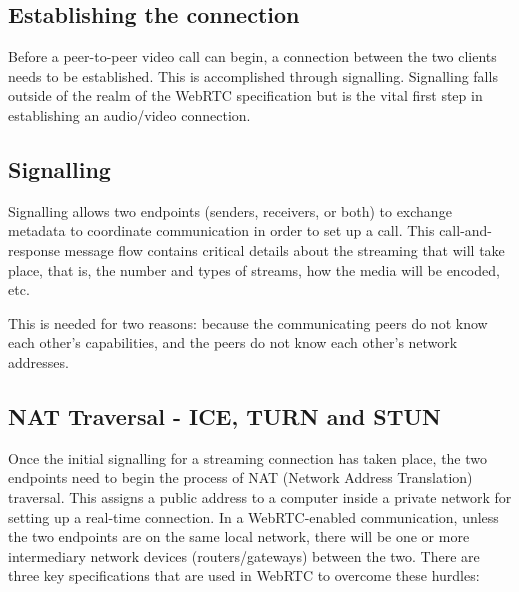 \subsection{Establishing the connection}

Before a peer-to-peer video call can begin, a connection between the two clients 
needs to be established. This is accomplished through signalling. Signalling falls 
outside of the realm of the WebRTC specification but is the vital first step in establishing 
an audio/video connection.

\subsection{Signalling}

Signalling allows two endpoints (senders, receivers, or both) to exchange metadata to 
coordinate communication in order to set up a call. This call-and-response message flow 
contains critical details about the streaming that will take place, that is, the number 
and types of streams, how the media will be encoded, etc. 

This is needed for two reasons: because the communicating peers do not know each other’s 
capabilities, and the peers do not know each other’s network addresses.

\subsection{NAT Traversal - ICE, TURN and STUN}

Once the initial signalling for a streaming connection has taken place, the two endpoints need 
to begin the process of NAT (Network Address Translation) traversal.
This assigns a public address to a computer inside a private network for setting up a real-time connection. 
In a WebRTC-enabled communication, unless the two endpoints are on the same local network, 
there will be one or more intermediary network devices (routers/gateways) between the two. 
There are three key specifications that are used in WebRTC to overcome these hurdles:

